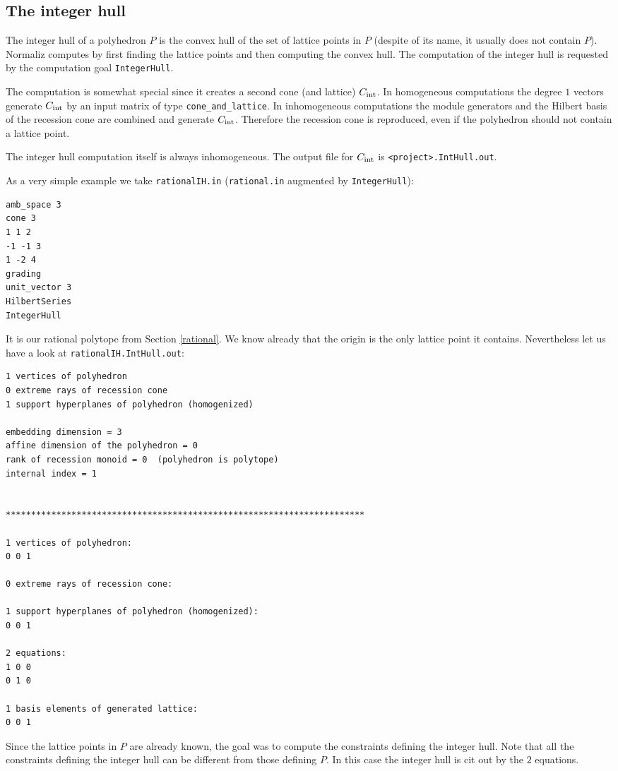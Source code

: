 \documentclass[12pt,a4paper]{scrartcl}
\theoremstyle{definition}
\begin{document}
\subsection{The integer hull}\label{IntHull}

The integer hull of a polyhedron $P$ is the convex hull of the set of lattice points in $P$ (despite of its name, it usually does not contain $P$). Normaliz computes by first finding the lattice points and then computing the convex hull. The computation of the integer hull is requested by the computation goal \verb|IntegerHull|.

The computation is somewhat special since it creates a second cone (and lattice) $C_\textup{int}$. In homogeneous computations the degree $1$ vectors generate $C_\textup{int}$ by an input matrix of type \verb|cone_and_lattice|. In inhomogeneous computations the module generators and the Hilbert basis of the recession cone are combined and generate $C_\textup{int}$. Therefore the recession cone is reproduced, even if the polyhedron should not contain a lattice point.

The integer hull computation itself is always inhomogeneous. The output file for $C_\textup{int}$ is \verb|<project>.IntHull.out|.

As a very simple example we take \verb|rationalIH.in| (\verb|rational.in| augmented by \verb|IntegerHull|):
\begin{Verbatim}
amb_space 3
cone 3
1 1 2
-1 -1 3
1 -2 4
grading
unit_vector 3
HilbertSeries
IntegerHull
\end{Verbatim}
It is our rational polytope from Section \ref{rational}. We know already that the origin is the only lattice point it contains. Nevertheless let us have a look at \verb|rationalIH.IntHull.out|:

\begin{Verbatim}
1 vertices of polyhedron
0 extreme rays of recession cone
1 support hyperplanes of polyhedron (homogenized)

embedding dimension = 3
affine dimension of the polyhedron = 0
rank of recession monoid = 0  (polyhedron is polytope)
internal index = 1


***********************************************************************

1 vertices of polyhedron:
0 0 1

0 extreme rays of recession cone:

1 support hyperplanes of polyhedron (homogenized):
0 0 1

2 equations:
1 0 0
0 1 0

1 basis elements of generated lattice:
0 0 1
\end{Verbatim}
Since the lattice points in $P$ are already known, the goal was to compute the constraints defining the integer hull. Note that all the constraints defining the integer hull can be different from those defining $P$. In this case the integer hull is cit out by the $2$ equations.
\end{document}
